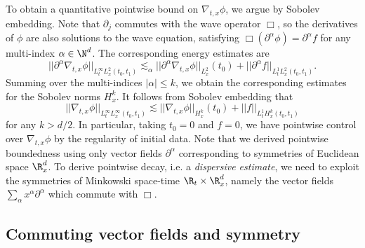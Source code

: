 To obtain a quantitative pointwise bound on $\nabla_{t, x} \phi$, we argue by Sobolev embedding. Note that $\partial_j$ commutes with the wave operator $\Box$, so the derivatives of $\phi$ are also solutions to the wave equation, satisfying $\Box (\partial^{\alpha} \phi) = \partial^\alpha f$ for any multi-index $\alpha \in \N^d$. The corresponding energy estimates are
	\[ ||\partial^\alpha \nabla_{t, x} \phi||_{L^\infty_t L_x^2 (t_0, t_1)} \lesssim_\alpha ||\partial^{\alpha} \nabla_{t, x} \phi ||_{L^2_x} (t_0) + ||\partial^\alpha f||_{L^1_t L^2_x (t_0, t_1)}.  \]
Summing over the multi-indices $|\alpha|\leq k$, we obtain the corresponding estimates for the Sobolev norms $H^k_x$. It follows from Sobolev embedding that
	\[ ||\nabla_{t, x} \phi||_{L^\infty_t L^\infty_x (t_0, t_1)}  \lesssim ||\nabla_{t, x} \phi||_{H^k_x} (t_0) + ||f||_{L^1_t H^k_x (t_0, t_1)} \]
for any $k > d/2$. In particular, taking $t_0 = 0$ and $f = 0$, we have pointwise control over $\nabla_{t, x} \phi$ by the regularity of initial data. Note that we derived pointwise boundedness using only vector fields $\partial^\alpha$ corresponding to symmetries of Euclidean space $\R^d_x$. To derive pointwise decay, i.e. a \textit{dispersive estimate}, we need to exploit the symmetries of Minkowski space-time $\R_t \times \R^d_x$, namely the vector fields $\sum_\alpha x^\alpha \partial^\alpha$ which commute with $\Box$.
	
\subsection{Commuting vector fields and symmetry}

